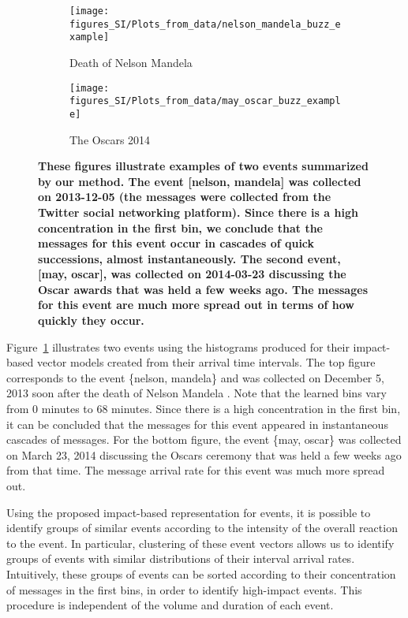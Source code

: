 \begin{figure}
  \centering
  \begin{subfigure}[b]{\textwidth}
    \texttt{[image: figures\_SI/Plots\_from\_data/nelson\_mandela\_buzz\_example]}
    \caption{Death of Nelson Mandela}
  \end{subfigure}
  \begin{subfigure}[b]{\textwidth}
    \texttt{[image: figures\_SI/Plots\_from\_data/may\_oscar\_buzz\_example]}
    \caption{The Oscars 2014}
  \end{subfigure}
  \caption{\textbf{These figures illustrate examples of two events
      summarized by our method. The event [nelson, mandela] was
      collected on 2013-12-05 (the messages were collected from the
      Twitter social networking platform). Since there is a high
      concentration in the first bin, we conclude that the messages
      for this event occur in cascades of quick successions, almost
      instantaneously. The second event, [may, oscar], was collected
      on 2014-03-23 discussing the Oscar awards that was held a few
      weeks ago. The messages for this event are much more spread out
      in terms of how quickly they occur.}}
  \label{fig:example_buzz}
\end{figure}

Figure~\ref{fig:example_buzz} illustrates two events using the
histograms produced for their impact-based vector models created from
their arrival time intervals. The top figure corresponds to the event
\{nelson, mandela\} and was collected on December 5, 2013 soon after
the death of Nelson
Mandela \cite{nelson_mandela_dead}.
Note that the learned bins vary from
$0$ minutes to $68$ minutes. Since there is a high concentration in
the first bin, it can be concluded that the messages for this event
appeared in instantaneous cascades of messages. For the bottom figure,
the event \{may, oscar\} was collected on March 23, 2014 discussing
the Oscars ceremony that was held a few weeks ago from that time. The
message arrival rate for this event was much more spread out.

Using the proposed impact-based representation for events, it is
possible to identify groups of similar events according to the
intensity of the overall reaction to the event. In particular,
clustering of these event vectors allows us to identify groups of
events with similar distributions of their interval arrival rates.
Intuitively, these groups of events can be sorted according to their
concentration of messages in the first bins, in order to identify
high-impact events. This procedure is independent of the volume and
duration of each event.

